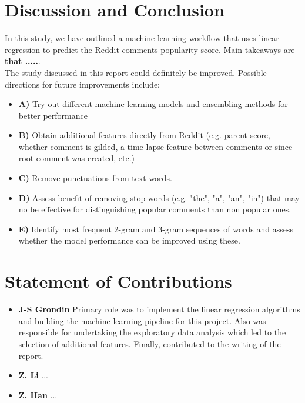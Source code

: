 \documentclass[11pt]{article}
\begin{document}
\section{Discussion and Conclusion}
In this study, we have outlined a machine learning workflow that uses linear regression to predict the Reddit comments popularity score. Main takeaways are \textbf{that .....}.
\\
The study discussed in this report could definitely be improved. Possible directions for future improvements include: 
\begin{itemize}
    	\item \textbf{A)} Try out different machine learning models and ensembling methods for better performance
   	\item \textbf{B)} Obtain additional features directly from Reddit (e.g. parent score, whether comment is gilded, a time lapse feature between comments or since root comment was created, etc.)
    	\item \textbf{C)} Remove punctuations from text words.
 	\item \textbf{D)} Assess benefit of removing stop words (e.g. "the", "a", "an", "in") that may no be effective for distinguishing popular comments than non popular ones. 
	\item \textbf{E)} Identify most frequent 2-gram and 3-gram sequences of words and assess whether the model performance can be improved using these.
\end{itemize}

\section{Statement of Contributions}
\begin{itemize}
    	\item \textbf{J-S Grondin} Primary role was to implement the linear regression algorithms and building the machine learning pipeline for this project. Also was responsible for undertaking the exploratory data analysis which led to the selection of additional features. Finally, contributed to the writing of the report. 
   	\item \textbf{Z. Li} ...
    	\item \textbf{Z. Han} ...
\end{itemize}
\end{document}
